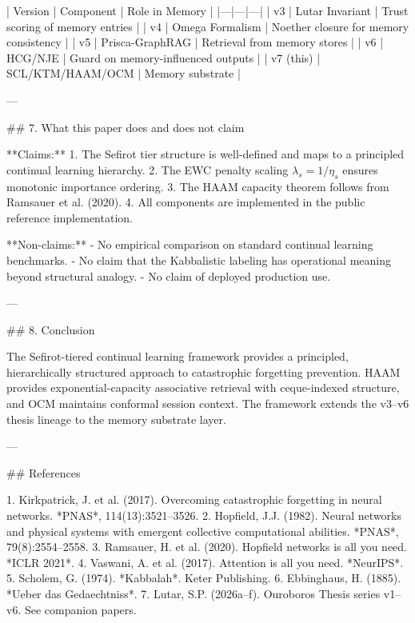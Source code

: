 | Version | Component | Role in Memory |
|---|---|---|
| v3 | Lutar Invariant | Trust scoring of memory entries |
| v4 | Omega Formalism | Noether closure for memory consistency |
| v5 | Prisca-GraphRAG | Retrieval from memory stores |
| v6 | HCG/NJE | Guard on memory-influenced outputs |
| v7 (this) | SCL/KTM/HAAM/OCM | Memory substrate |

---

## 7. What this paper does and does not claim

**Claims:**
1. The Sefirot tier structure is well-defined and maps to a principled continual learning hierarchy.
2. The EWC penalty scaling \( \lambda_s = 1/\eta_s \) ensures monotonic importance ordering.
3. The HAAM capacity theorem follows from Ramsauer et al. (2020).
4. All components are implemented in the public reference implementation.

**Non-claims:**
- No empirical comparison on standard continual learning benchmarks.
- No claim that the Kabbalistic labeling has operational meaning beyond structural analogy.
- No claim of deployed production use.

---

## 8. Conclusion

The Sefirot-tiered continual learning framework provides a principled, hierarchically structured approach to catastrophic forgetting prevention. HAAM provides exponential-capacity associative retrieval with ceque-indexed structure, and OCM maintains conformal session context. The framework extends the v3--v6 thesis lineage to the memory substrate layer.

---

## References

1. Kirkpatrick, J. et al. (2017). Overcoming catastrophic forgetting in neural networks. *PNAS*, 114(13):3521--3526.
2. Hopfield, J.J. (1982). Neural networks and physical systems with emergent collective computational abilities. *PNAS*, 79(8):2554--2558.
3. Ramsauer, H. et al. (2020). Hopfield networks is all you need. *ICLR 2021*.
4. Vaswani, A. et al. (2017). Attention is all you need. *NeurIPS*.
5. Scholem, G. (1974). *Kabbalah*. Keter Publishing.
6. Ebbinghaus, H. (1885). *Ueber das Gedaechtniss*.
7. Lutar, S.P. (2026a--f). Ouroboros Thesis series v1--v6. See companion papers.
